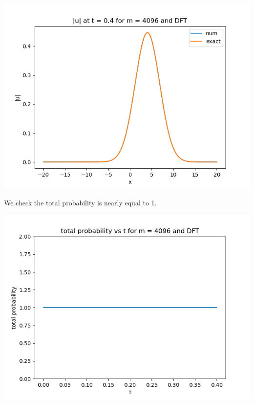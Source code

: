 \documentclass{article}
\begin{document}
\begin{enumerate}[label=(\alph*)]
\begin{center}
	\includegraphics[scale=.3]{FINAL u_abs t = 0.4 m = 4096 DFT}
\end{center}
We check the total probability is nearly equal to 1.
\begin{center}
	\includegraphics[scale=.5]{FINAL prob m = 4096 DFT}
\end{center}



\end{enumerate}
\end{document}
